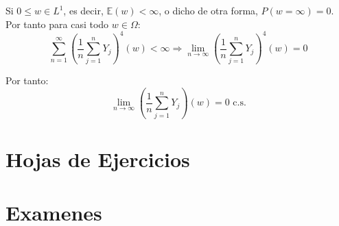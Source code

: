 \documentclass{apuntes}
\begin{document}
Si $0 \leq w \in L^1$, es decir, $\mathbb{E}(w) < \infty$, o dicho de otra forma, $P(w = \infty)=0$. Por tanto para casi todo $w \in \Omega$:
\[
\sum_{n=1}^{\infty}(\frac{1}{n}\sum_{j=1}^{n}Y_j)^4 (w) < \infty  \Rightarrow \lim_{n \rightarrow \infty}(\frac{1}{n}\sum_{j=1}^{n}Y_j)^4 (w) = 0
\]

Por tanto:
\[
\lim_{n \rightarrow \infty}(\frac{1}{n}\sum_{j=1}^{n}Y_j) (w) = 0 \text{ c.s.}
\]









%



\chapter{Hojas de Ejercicios}


\chapter{Examenes}

\end{document}
